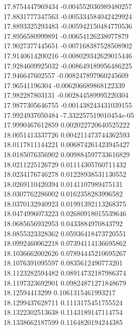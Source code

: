 {17.8754447969434 -0.004552036989480257 \\
17.8831777347563 -0.005334584042429924 \\
17.8893325293483 -0.005942150484770536 \\
17.8956580999891 -0.00654126238077879 \\
17.9027377445651 -0.007168387528508902 \\
17.9140614200216 -0.008029342629015446 \\
17.9284609925032 -0.008649189956486225 \\
17.946647602557 -0.008247897960245609 \\
17.96541196304 -0.006206689868122339 \\
17.982287803131 -0.002844589995220304 \\
17.9877305646755 -0.001438243431039155 \\
17.9924937050484 -7.332257519010454e-05 \\
17.9990467612859 0.002022720640525222 \\
18.0051413337726 0.004211473744362593 \\
18.0117811144221 0.006874261423945427 \\
18.0185076356902 0.009884597733616829 \\
18.0211225126729 0.01114305760711432 \\
18.0234176746278 0.01228938531130552 \\
18.0269110420394 0.0141107989475131 \\
18.0307762286002 0.0162358283996582 \\
18.0370132940923 0.01991392113268375 \\
18.0474996073223 0.02680918015539646 \\
18.0685656932953 0.0433884970843792 \\
18.0855323328362 0.05936418473720551 \\
18.0992460062218 0.07394114136695862 \\
18.1036662002626 0.07894445210695267 \\
18.1076391095597 0.0835612490773201 \\
18.1123282594482 0.08914732187986374 \\
18.1197323692901 0.09824871271848679 \\
18.12594413299 0.1061315461993217 \\
18.1299437628711 0.1113175451755524 \\
18.1322302513638 0.1143189147114754 \\
18.1338662187599 0.1164820194244385 \\
}
